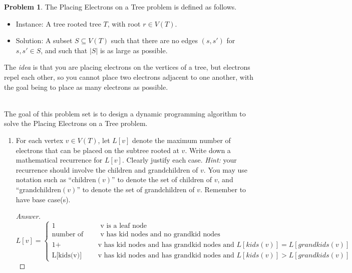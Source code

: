 \documentclass[11pt]{article}
\theoremstyle{definition}
\theoremstyle{definition}
\newtheorem{required}{Problem}
\theoremstyle{definition}
\begin{document}
\begin{required}
The \textsf{Placing Electrons on a Tree} problem is defined as follows. 
\begin{itemize}
\item \textsf{Instance:} A tree rooted tree $T$, with root $r \in V(T)$.
\item \textsf{Solution:} A subset $S \subseteq V(T)$ such that there are no edges $(s,s')$ for $s,s' \in S$, and such that $|S|$ is as large as possible.
\end{itemize}
The \emph{idea} is that you are placing electrons on the vertices of a tree, but electrons repel each other, so you cannot place two electrons adjacent to one another, with the goal being to place as many electrons as possible.

\noindent \\ The goal of this problem set is to design a dynamic programming algorithm to solve the \textsf{Placing Electrons on a Tree} problem.

\begin{enumerate}[label=(\alph*)]
\subsection{Problem 2\ref{2a}}
\item \label{2a} For each vertex $v \in V(T)$, let $L[v]$ denote the maximum number of electrons that can be placed on the subtree rooted at $v$. Write down a mathematical recurrence for $L[v]$. Clearly justify each case. \emph{Hint:} your recurrence should involve the children and grandchildren of $v$. You may use notation such as ``children$(v)$'' to denote the set of children of $v$, and ``grandchildren$(v)$'' to denote the set of grandchildren of $v$. Remember to have base case(s).

\begin{proof}[Answer]
\[
  L[v] =
  \begin{cases}
                                   1 & \text{ v is a leaf node} \\
                                   \text{number of kids(v)} & \text{ v has kid nodes and no grandkid nodes } \\
				\text{1+ L[kids(v)]} & \text{v has kid nodes and has grandkid nodes and $L[kids(v)] = L[grandkids(v)]$}\\
				\text{L[kids(v)]} & \text{v has kid nodes and has grandkid nodes and $L[kids(v)] > L[grandkids(v)]$}
  				
  \end{cases}
\]
\end{proof}




\end{enumerate}
\end{required}
\end{document}
